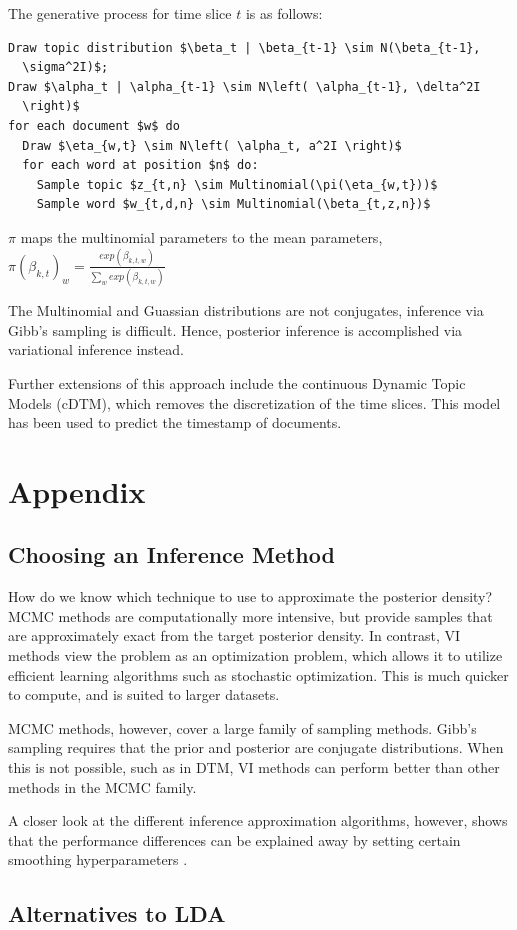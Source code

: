 \documentclass[letterpaper]{article}
\begin{document}
The generative process for time slice $t$ is as follows:

\begin{lstlisting}[mathescape=true]
Draw topic distribution $\beta_t | \beta_{t-1} \sim N(\beta_{t-1},
  \sigma^2I)$;
Draw $\alpha_t | \alpha_{t-1} \sim N\left( \alpha_{t-1}, \delta^2I
  \right)$
for each document $w$ do
  Draw $\eta_{w,t} \sim N\left( \alpha_t, a^2I \right)$
  for each word at position $n$ do:
    Sample topic $z_{t,n} \sim Multinomial(\pi(\eta_{w,t}))$
    Sample word $w_{t,d,n} \sim Multinomial(\beta_{t,z,n})$
\end{lstlisting}

$\pi$ maps the multinomial parameters to the mean parameters,
$\pi\left( \beta_{k,t} \right)_w = \frac{exp(\beta_{k,t,w})}{\sum_w exp\left( \beta_{k,t,w} \right)}$

The Multinomial and Guassian distributions are not conjugates,
inference via Gibb's sampling is difficult. Hence, posterior inference
is accomplished via variational inference instead.

Further extensions of this approach include the continuous Dynamic
Topic Models (cDTM), which removes the discretization of the time
slices. \citep{wang-2012-contin-time} This model has been used to
predict the timestamp of documents.

\section{Appendix}
\subsection{Choosing an Inference Method}
\label{sub:choosing-inference}
How do we know which technique to use to approximate the posterior
density? MCMC methods are computationally more intensive, but provide
samples that are approximately exact from the target posterior
density. In contrast, VI methods view the problem as an optimization
problem, which allows it to utilize efficient learning algorithms such
as stochastic optimization. This is much quicker to compute, and is
suited to larger datasets.

MCMC methods, however, cover a large family of sampling methods.
Gibb's sampling requires that the prior and posterior are conjugate
distributions. When this is not possible, such as in DTM, VI methods
can perform better than other methods in the MCMC family.

A closer look at the different inference approximation algorithms,
however, shows that the performance differences can be explained away
by setting certain smoothing hyperparameters
\citep{asuncion-2012-smoot-infer}.

\subsection{Alternatives to LDA}


\end{document}
